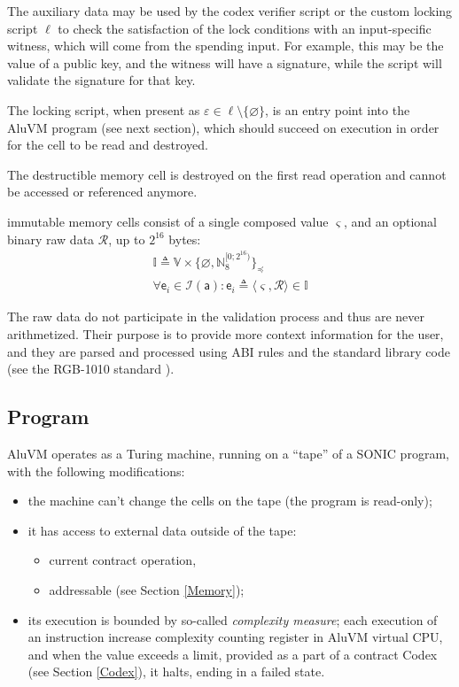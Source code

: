 \documentclass[9pt,oneside]{amsart}
\begin{document}
\begin{multicols}{2}
The auxiliary data may be used by the codex verifier script or the custom locking script $\ell$
to check the satisfaction of the lock conditions with an input-specific witness,
which will come from the spending input.
For example, this may be the value of a public key, and the witness will have a signature,
while the script will validate the signature for that key.

The locking script, when present as $\varepsilon \in \ell \setminus \{ \varnothing \}$,
is an entry point into the AluVM program (see next section),
which should succeed on execution in order for the cell to be read and destroyed.

The destructible memory cell is destroyed on the first read operation
and cannot be accessed or referenced anymore.

\Gls{immutable memory} cells consist of a single \gls{composed value} $\varsigma$,
and an optional binary raw data $\mathcal{R}$, up to $2^{16}$ bytes:
\noindent
\begin{gather}
\mathbb{I} \triangleq \mathbb{V} \times \{ \varnothing, \mathbb{N}_8^{[0; 2^{16})} \}_\preceq \\
\forall \mathsf{e}_i \in \mathcal{I}(\mathsf{a}) : \mathsf{e}_i \triangleq \langle \varsigma, \mathcal{R} \rangle \in \mathbb{I}
\end{gather}

The raw data do not participate in the validation process and thus are never arithmetized.
Their purpose is to provide more context information for the user, and they are parsed and processed
using ABI rules and the standard library code (see the RGB-1010 standard \cite{RGB1010}).


\subsection{Program}\label{Program}

AluVM operates as a Turing machine, running on a ``tape'' of a SONIC program,
with the following modifications:

\begin{itemize}
\item the machine can't change the cells on the tape (the program is read-only);
\item it has access to external data outside of the tape:
    \begin{itemize}
    \item current contract operation,
    \item addressable (see Section \ref{Memory});
    \end{itemize}
\item its execution is bounded by so-called \emph{complexity measure};
    each execution of an instruction increase complexity counting register in AluVM virtual CPU,
    and when the value exceeds a limit,
    provided as a part of a contract Codex (see Section \ref{Codex}),
    it halts, ending in a failed state.
\end{itemize}


\end{multicols}
\end{document}
